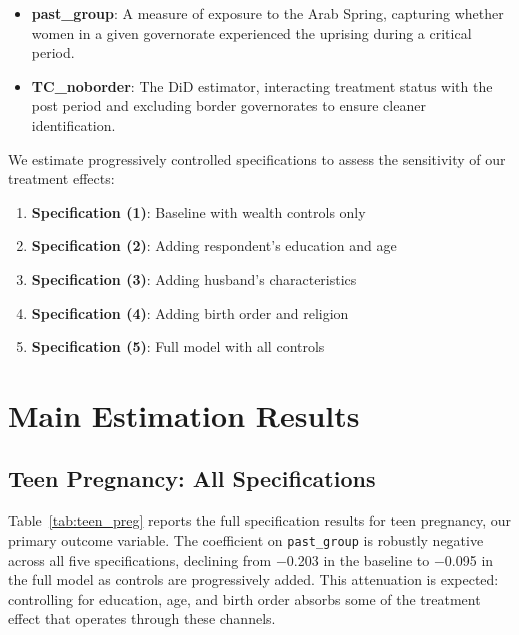 \documentclass[12pt,a4paper]{article}
\begin{document}
\begin{itemize}[nosep]
    \item \textbf{past\_group}: A measure of exposure to the Arab Spring, capturing whether women in a given governorate experienced the uprising during a critical period.
    \item \textbf{TC\_noborder}: The DiD estimator, interacting treatment status with the post period and excluding border governorates to ensure cleaner identification.
\end{itemize}

\noindent We estimate progressively controlled specifications to assess the sensitivity of our treatment effects:
\begin{enumerate}[nosep]
    \item \textbf{Specification (1)}: Baseline with wealth controls only
    \item \textbf{Specification (2)}: Adding respondent's education and age
    \item \textbf{Specification (3)}: Adding husband's characteristics
    \item \textbf{Specification (4)}: Adding birth order and religion
    \item \textbf{Specification (5)}: Full model with all controls
\end{enumerate}
\vspace{0.25cm}

\section{Main Estimation Results}

\subsection{Teen Pregnancy: All Specifications}

Table~\ref{tab:teen_preg} reports the full specification results for teen pregnancy, our primary outcome variable. The coefficient on \texttt{past\_group} is robustly negative across all five specifications, declining from $-$0.203 in the baseline to $-$0.095 in the full model as controls are progressively added. This attenuation is expected: controlling for education, age, and birth order absorbs some of the treatment effect that operates through these channels.
\vspace{0.25cm}
\end{document}
